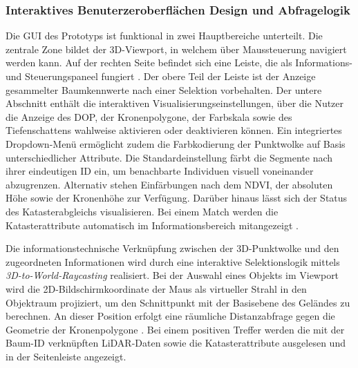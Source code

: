 \subsubsection{Interaktives Benuterzeroberflächen Design und Abfragelogik}

Die GUI des Prototyps ist funktional in zwei Hauptbereiche unterteilt. Die zentrale Zone bildet der 3D-Viewport, in welchem über Maussteuerung navigiert werden kann. Auf der rechten Seite befindet sich eine Leiste, die als Informations- und Steuerungspaneel fungiert \cite{wangAutomatedPhenotypicTrait2024}. Der obere Teil der Leiste ist der Anzeige gesammelter Baumkennwerte nach einer Selektion vorbehalten. Der untere Abschnitt enthält die interaktiven Visualisierungseinstellungen, über die Nutzer die Anzeige des DOP, der Kronenpolygone, der Farbskala sowie des Tiefenschattens wahlweise aktivieren oder deaktivieren können. Ein integriertes Dropdown-Menü ermöglicht zudem die Farbkodierung der Punktwolke auf Basis unterschiedlicher Attribute. Die Standardeinstellung färbt die Segmente nach ihrer eindeutigen ID ein, um benachbarte Individuen visuell voneinander abzugrenzen. Alternativ stehen Einfärbungen nach dem NDVI, der absoluten Höhe sowie der Kronenhöhe zur Verfügung. Darüber hinaus lässt sich der Status des Katasterabgleichs visualisieren. Bei einem Match werden die Katasterattribute automatisch im Informationsbereich mitangezeigt \cite{wegenNonPhotorealisticRendering3D2024}.

Die informationstechnische Verknüpfung zwischen der 3D-Punktwolke und den zugeordneten Informationen wird durch eine interaktive Selektionslogik mittels \textit{3D-to-World-Raycasting} realisiert. Bei der Auswahl eines Objekts im Viewport wird die 2D-Bildschirmkoordinate der Maus als virtueller Strahl in den Objektraum projiziert, um den Schnittpunkt mit der Basisebene des Geländes zu berechnen. An dieser Position erfolgt eine räumliche Distanzabfrage gegen die Geometrie der Kronenpolygone \cite{kempfObliqueViewIndividual2021}. Bei einem positiven Treffer werden die mit der Baum-ID verknüpften LiDAR-Daten sowie die Katasterattribute ausgelesen und in der Seitenleiste angezeigt. 